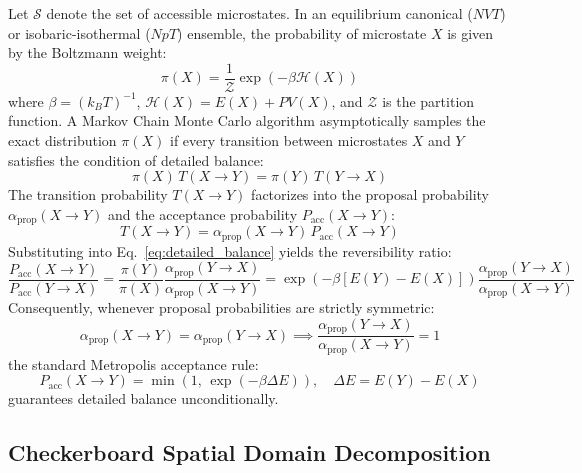 \documentclass[11pt,a4paper]{article}
\begin{document}
Let $\mathcal{S}$ denote the set of accessible microstates. In an equilibrium canonical ($NVT$) or isobaric-isothermal ($NpT$) ensemble, the probability of microstate $X$ is given by the Boltzmann weight:
\begin{equation}
    \pi(X) = \frac{1}{\mathcal{Z}} \exp(-\beta \mathcal{H}(X))
\end{equation}
where $\beta = (k_B T)^{-1}$, $\mathcal{H}(X) = E(X) + P V(X)$, and $\mathcal{Z}$ is the partition function. A Markov Chain Monte Carlo algorithm asymptotically samples the exact distribution $\pi(X)$ if every transition between microstates $X$ and $Y$ satisfies the condition of detailed balance:
\begin{equation}
    \label{eq:detailed_balance}
    \pi(X) \, T(X \to Y) = \pi(Y) \, T(Y \to X)
\end{equation}
The transition probability $T(X \to Y)$ factorizes into the proposal probability $\alpha_{\text{prop}}(X \to Y)$ and the acceptance probability $P_{\text{acc}}(X \to Y)$:
\begin{equation}
    T(X \to Y) = \alpha_{\text{prop}}(X \to Y) \, P_{\text{acc}}(X \to Y)
\end{equation}
Substituting into Eq.~\eqref{eq:detailed_balance} yields the reversibility ratio:
\begin{equation}
    \label{eq:reversibility_ratio}
    \frac{P_{\text{acc}}(X \to Y)}{P_{\text{acc}}(Y \to X)} = \frac{\pi(Y)}{\pi(X)} \frac{\alpha_{\text{prop}}(Y \to X)}{\alpha_{\text{prop}}(X \to Y)} = \exp\left(-\beta [E(Y) - E(X)]\right) \frac{\alpha_{\text{prop}}(Y \to X)}{\alpha_{\text{prop}}(X \to Y)}
\end{equation}
Consequently, whenever proposal probabilities are strictly symmetric:
\begin{equation}
    \alpha_{\text{prop}}(X \to Y) = \alpha_{\text{prop}}(Y \to X) \implies \frac{\alpha_{\text{prop}}(Y \to X)}{\alpha_{\text{prop}}(X \to Y)} = 1
\end{equation}
the standard Metropolis acceptance rule:
\begin{equation}
    P_{\text{acc}}(X \to Y) = \min\left(1, \, \exp(-\beta \Delta E)\right), \quad \Delta E = E(Y) - E(X)
\end{equation}
guarantees detailed balance unconditionally.

\subsection{Checkerboard Spatial Domain Decomposition}
\end{document}

